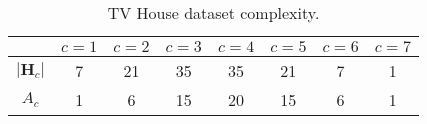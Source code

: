 \begin{table}[H]
\centering
\begin{tabular}{c|c|c|c|c|c|c|c|}
\cline{2-8}
                       & $c = 1$ & $c = 2$ & $c = 3$ & $c = 4$ & $c = 5$ & $c = 6$ & $c = 7$ \\ \hline
\multicolumn{1}{|c|}{$|\textbf{H}_c|$} &    7   &    21   &    35   &    35   &   21    &   7    &    1  \\ \hline
\multicolumn{1}{|c|}{$A_c$} &    1   &     6  &     15  &     20  &    15   &    6   &    1   \\ \hline
\end{tabular}
\caption{TV House dataset complexity.}
\label{Tab:TvHouse}
\end{table}